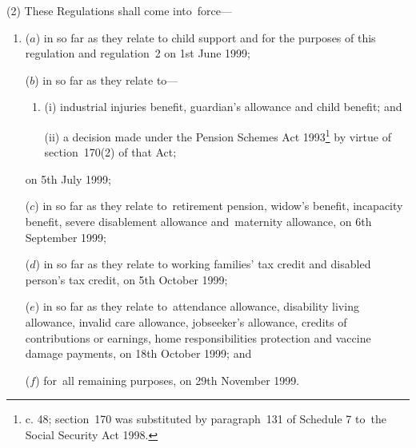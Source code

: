\documentclass[12pt,a4paper]{article}
\begin{document}
(2) These Regulations shall come into~force—
\begin{enumerate}\item[]
($a$) in so far as they relate to child support and for the purposes of this regulation and regulation~2 on 1st June 1999;

($b$) in so far as they relate to—
\begin{enumerate}\item[]
(i) industrial injuries benefit, guardian’s allowance and child benefit; and

(ii) a decision made under the Pension Schemes Act 1993\footnote{ c. 48; section~170 was substituted by paragraph~131 of Schedule 7 to~the Social Security Act 1998.} by virtue of section~170(2) of that Act;
\end{enumerate}
on 5th July 1999;

($c$) in so far as they relate to~retirement pension, widow’s benefit, incapacity benefit, severe disablement allowance and~maternity allowance, on 6th September 1999;

($d$) in so far as they relate to
working families' tax credit and disabled person’s tax credit,  %
on 5th October 1999;

\enlargethispage{\baselineskip}

($e$) in so far as they relate to~attendance allowance, disability living allowance, invalid care allowance, jobseeker’s allowance, credits of contributions or earnings, home responsibilities protection and vaccine damage payments, on 18th October 1999; and

($f$) for~all remaining purposes, on 29th November 1999.
\end{enumerate}
\end{document}
